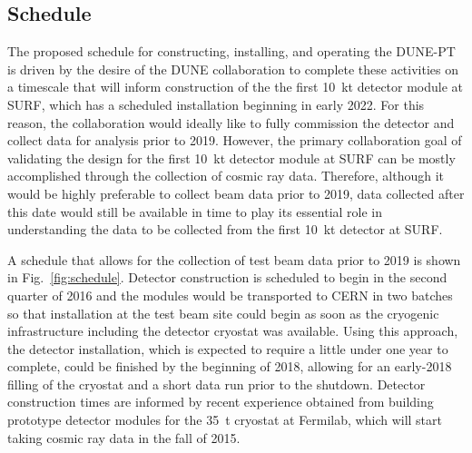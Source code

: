 


\subsection{Schedule}

The proposed schedule for constructing, installing, and operating the DUNE-PT is driven by the desire of the DUNE collaboration to 
complete these activities on a timescale that will inform construction of the the first 10~kt detector module at SURF, which has 
a scheduled installation beginning in early 2022.  For this reason, the collaboration would ideally like to fully commission the 
detector and collect data for analysis prior to 2019.  However, the primary collaboration goal of validating the design for the 
first 10~kt detector module at SURF can be mostly accomplished through the collection of cosmic ray data.  Therefore, although 
it would be highly preferable to collect beam data prior to 2019, data collected after this date would still be available in time 
to play its essential role in understanding the data to be collected from the first 10~kt detector at SURF.   

A schedule that allows for the collection of test beam data prior to 2019 is shown in Fig.~\ref{fig:schedule}.  Detector construction 
is scheduled to begin in the second quarter of 2016 and the modules would be transported to CERN in two batches so that installation 
at the test beam site could begin as soon as the cryogenic infrastructure including the detector cryostat was available.  Using 
this approach, the detector installation, which is expected to require a little under one year to complete, could be finished by 
the beginning of 2018, allowing for an early-2018 filling of the cryostat and a short data run prior to the shutdown.  Detector 
construction times are informed by recent experience obtained from building prototype detector modules for the 35~t cryostat at 
Fermilab, which will start taking cosmic ray data in the fall of 2015.          

